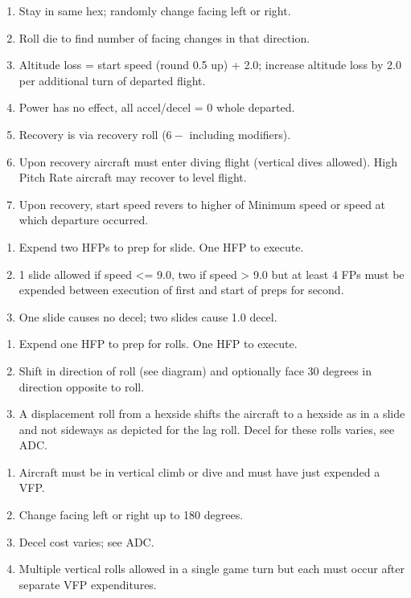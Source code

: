 \begin{table*}
\begin{multicols}{2}
\begin{enumerate}[nosep]
    \item Stay in same hex; randomly change facing left or right.
    \item Roll die to find number of facing changes in that direction.
    \item Altitude loss = start speed (round 0.5 up) + 2.0; increase altitude loss by 2.0 per additional turn of departed flight.
    \item Power has no effect, all accel/decel = 0 whole departed.
    \item Recovery is via recovery roll ($6-$ including modifiers).
    \item Upon recovery aircraft must enter diving flight (vertical dives allowed). High Pitch Rate aircraft may recover to level flight.
    \item Upon recovery, start speed revers to higher of Minimum speed or speed at which departure occurred.
\end{enumerate}



\begin{enumerate}[nosep]
    \item Expend two HFPs to prep for slide. One HFP to execute.
    \item 1 slide allowed if speed <= 9.0, two if speed > 9.0 but at least 4 FPs must be expended between execution of first and start of preps for second.
    \item One slide causes no decel; two slides cause 1.0 decel.
\end{enumerate}


\begin{enumerate}[nosep]
    \item Expend one HFP to prep for rolls. One HFP to execute.
    \item Shift in direction of roll (see diagram) and optionally face 30 degrees in direction opposite to roll.
    \item A displacement roll from a hexside shifts the aircraft to a hexside as in a slide and not sideways as depicted for the lag roll. Decel for these rolls varies, see ADC.
\end{enumerate}


\begin{enumerate}[nosep]
    \item Aircraft must be in vertical climb or dive and must have just expended a VFP.
    \item Change facing left or right up to 180 degrees.
    \item Decel cost varies; see ADC.
    \item Multiple vertical rolls allowed in a single game turn but each must occur after separate VFP expenditures.
\end{enumerate}


\end{multicols}
\end{table*}

